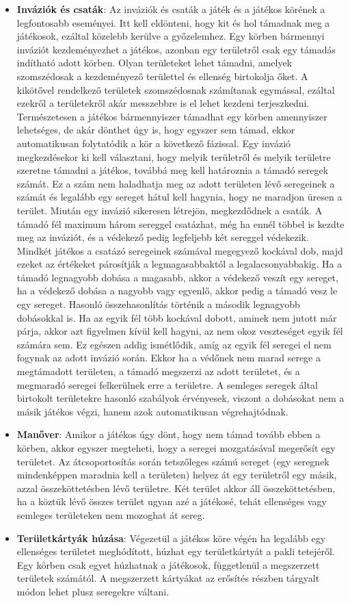 \documentclass[
]{thesis-ekf}
\theoremstyle{definition}
\theoremstyle{remark}
\begin{document}
\begin{itemize}
	\item \textbf{Inváziók és csaták}: Az inváziók és csaták a játék és a játékos körének a legfontosabb eseményei. Itt kell eldönteni, hogy kit és hol támadnak meg a játékosok, ezáltal közelebb kerülve a győzelemhez. Egy körben bármennyi inváziót kezdeményezhet a játékos, azonban egy területről csak egy támadás indítható adott körben. Olyan területeket lehet támadni, amelyek szomszédosak a kezdeményező területtel és ellenség birtokolja őket. A kikötővel rendelkező területek szomszédosnak számítanak egymással, ezáltal ezekről a területekről akár messzebbre is el lehet kezdeni terjeszkedni. Természetesen a játékos bármennyiszer támadhat egy körben amennyiszer lehetséges, de akár dönthet úgy is, hogy egyszer sem támad, ekkor automatikusan folytatódik a kör a következő fázissal. Egy invázió megkezdésekor ki kell választani, hogy melyik területről és melyik területre szeretne támadni a játékos, továbbá meg kell határoznia a támadó seregek számát. Ez a szám nem haladhatja meg az adott területen lévő seregeinek a számát és legalább egy sereget hátul kell hagynia, hogy ne maradjon üresen a terület. Miután egy invázió sikeresen létrejön, megkezdődnek a csaták. A támadó fél maximum három sereggel csatázhat, még ha ennél többel is kezdte meg az inváziót, és a védekező pedig legfeljebb két sereggel védekezik. Mindkét játékos a csatázó seregeinek számával megegyező kockával dob, majd ezeket az értékeket párosítják a legmagasabbaktól a legalacsonyabbakig. Ha a támadó legnagyobb dobása a magasabb, akkor a védekező veszít egy sereget, ha a védekező dobása a nagyobb vagy egyenlő, akkor pedig a támadó vesz le egy sereget. Hasonló összehasonlítás történik a második legnagyobb dobásokkal is. Ha az egyik fél több kockával dobott, aminek nem jutott már párja, akkor azt figyelmen kívül kell hagyni, az nem okoz veszteséget egyik fél számára sem. Ez egészen addig ismétlődik, amíg az egyik fél seregei el nem fogynak az adott invázió során. Ekkor ha a védőnek nem marad serege a megtámadott területen, a támadó megszerzi az adott területet, és a megmaradó seregei felkerülnek erre a területre. A semleges seregek által birtokolt területekre hasonló szabályok érvényesek, viszont a dobásokat nem a másik játékos végzi, hanem azok automatikusan végrehajtódnak.
	\item \textbf{Manőver}: Amikor a játékos úgy dönt, hogy nem támad tovább ebben a körben, akkor egyszer megteheti, hogy a seregei mozgatásával megerősít egy területet. Az átcsoportosítás során tetszőleges számú sereget (egy seregnek mindenképpen maradnia kell a területen) helyez át egy területről egy másik, azzal összeköttetésben lévő területre. Két terület akkor áll összeköttetésben, ha a köztük lévő összes terület ugyan azé a játékosé, tehát ellenséges vagy semleges területeken nem mozoghat át sereg.
	\item \textbf{Területkártyák húzása}: Végezetül a játékos köre végén ha legalább egy ellenséges területet meghódított, húzhat egy területkártyát a pakli tetejéről. Egy körben csak egyet húzhatnak a játékosok, függetlenül a megszerzett területek számától. A megszerzett kártyákat az erősítés részben tárgyalt módon lehet plusz seregekre váltani.
\end{itemize}
\end{document}
